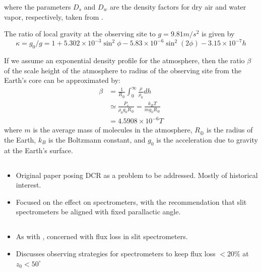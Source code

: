 \documentclass[]{article}
\begin{document}
where the parameters $D_s$ and $D_w$ are the density factors for dry air and water vapor, respectively, taken from \cite{Owens:67}.

The ratio of local gravity at the observing site to $g = 9.81 m/s^2$ is given by
\begin{equation}
\kappa = g_0/g = 1 + 5.302\times 10^{-3} \sin^2\phi - 5.83\times 10^{-6} \sin^2(2\phi) - 3.15\times 10^{-7} h \label{eqn:kappa}
\end{equation}

If we assume an exponential density profile for the atmosphere, then the ratio $\beta$ of the scale height of the atmosphere to radius of the observing site from the Earth's core can be approximated by:
\begin{align}
	\beta &= \frac{1}{R_\oplus}\int_{0}^\infty \frac{\rho}{\rho_0} dh \nonumber \\
	&\simeq \frac{P_s}{\rho_0g_0 R_\oplus} = \frac{k_BT}{m g_0 R_\oplus} \nonumber \\
	&=  4.5908\times 10^{-6} T \label{eqn:beta}
\end{align}
where $m$ is the average mass of molecules in the atmosphere, $R_\oplus$ is the radius of the Earth, $k_B$ is the Boltzmann constant, and $g_0$ is the acceleration due to gravity at the Earth's surface.



\subsection{\cite{Filippenko1982}}
\begin{itemize}
	\item Original paper posing DCR as a problem to be addressed. Mostly of historical interest.
	\item Focused on the effect on spectrometers, with the
	recommendation that slit spectrometers be aligned with fixed
	parallactic angle. 
\end{itemize}

\subsection{\cite{Cuby1998}}
\begin{itemize}
	\item As with \citeauthor{Filippenko1982}, concerned with flux loss in slit spectrometers. 
	\item Discusses observing strategies for spectrometers to keep flux loss $< 20\%$ at $z_0<50^\circ$
\end{itemize}

\subsection{\cite{Tomaney1996}}
\subsection{\cite{Mangum2015}}
\subsection{\cite{Auer2000}}



\end{document}
